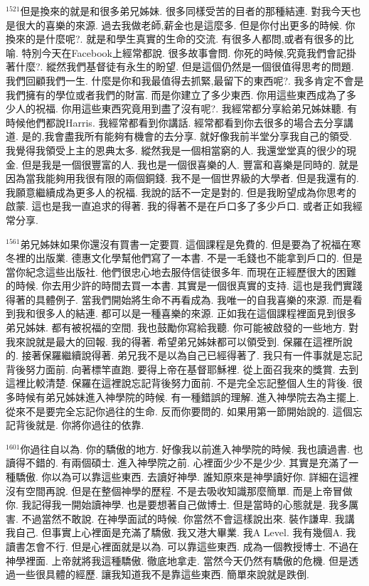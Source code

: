 \documentclass{book}
\begin{document}
$^{1521}$但是換來的就是和很多弟兄姊妹.
很多同樣受苦的目者的那種結連.
對我今天也是很大的喜樂的來源.
過去我做老師,薪金也是這麼多.
但是你付出更多的時候.
你換來的是什麼呢?.
就是和學生真實的生命的交流.
有很多人都問,或者有很多的比喻.
特別今天在Facebook上經常都說.
很多故事會問.
你死的時候,究竟我們會記掛著什麼?.
縱然我們基督徒有永生的盼望.
但是這個仍然是一個很值得思考的問題.
我們回顧我們一生.
什麼是你和我最值得去抓緊,最留下的東西呢?.
我多肯定不會是我們擁有的學位或者我們的財富.
而是你建立了多少東西.
你用這些東西成為了多少人的祝福.
你用這些東西究竟用到盡了沒有呢?.
我經常都分享給弟兄姊妹聽.
有時候他們都說Harris.
我經常都看到你講話.
經常都看到你去很多的場合去分享講道.
是的,我會盡我所有能夠有機會的去分享.
就好像我前半堂分享我自己的領受.
我覺得我領受上主的恩典太多.
縱然我是一個相當窮的人.
我還堂堂真的很少的現金.
但是我是一個很豐富的人.
我也是一個很喜樂的人.
豐富和喜樂是同時的.
就是因為當我能夠用我很有限的兩個銅錢.
我不是一個世界級的大學者.
但是我還有的.
我願意繼續成為更多人的祝福.
我說的話不一定是對的.
但是我盼望成為你思考的啟蒙.
這也是我一直追求的得著.
我的得著不是在戶口多了多少戶口.
或者正如我經常分享.

$^{1561}$弟兄姊妹如果你還沒有買書一定要買.
這個課程是免費的.
但是要為了祝福在寒冬裡的出版業.
德惠文化學幫他們寫了一本書.
不是一毛錢也不能拿到戶口的.
但是當你紀念這些出版社.
他們很忠心地去服侍信徒很多年.
而現在正經歷很大的困難的時候.
你去用少許的時間去買一本書.
其實是一個很真實的支持.
這也是我們實踐得著的具體例子.
當我們開始將生命不再看成為.
我唯一的自我喜樂的來源.
而是看到我和很多人的結連.
都可以是一種喜樂的來源.
正如我在這個課程裡面見到很多弟兄姊妹.
都有被祝福的空間.
我也鼓勵你寫給我聽.
你可能被啟發的一些地方.
對我來說就是最大的回報.
我的得著.
希望弟兄姊妹都可以領受到.
保羅在這裡所說的.
接著保羅繼續說得著.
弟兄我不是以為自己已經得著了.
我只有一件事就是忘記背後努力面前.
向著標竿直跑.
要得上帝在基督耶穌裡.
從上面召我來的獎賞.
去到這裡比較清楚.
保羅在這裡說忘記背後努力面前.
不是完全忘記整個人生的背後.
很多時候有弟兄姊妹進入神學院的時候.
有一種錯誤的理解.
進入神學院去為主擺上.
從來不是要完全忘記你過往的生命.
反而你要問的.
如果用第一節開始說的.
這個忘記背後就是.
你將你過往的依靠.

$^{1601}$你過往自以為.
你的驕傲的地方.
好像我以前進入神學院的時候.
我也讀過書.
也讀得不錯的.
有兩個碩士.
進入神學院之前.
心裡面少少不是少少.
其實是充滿了一種驕傲.
你以為可以靠這些東西.
去讀好神學.
誰知原來是神學讀好你.
詳細在這裡沒有空間再說.
但是在整個神學的歷程.
不是去吸收知識那麼簡單.
而是上帝冒做你.
我記得我一開始讀神學.
也是要想著自己做博士.
但是當時的心態就是.
我多厲害.
不過當然不敢說.
在神學面試的時候.
你當然不會這樣說出來.
裝作謙卑.
我講我自己.
但事實上心裡面是充滿了驕傲.
我又港大畢業.
我A Level.
我有幾個A.
我讀書怎會不行.
但是心裡面就是以為.
可以靠這些東西.
成為一個教授博士.
不過在神學裡面.
上帝就將我這種驕傲.
徹底地拿走.
當然今天仍然有驕傲的危機.
但是透過一些很具體的經歷.
讓我知道我不是靠這些東西.
簡單來說就是跌倒.
\end{document}

